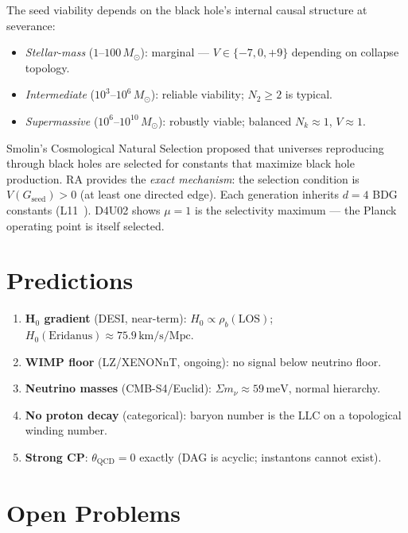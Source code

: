 \documentclass[12pt,a4paper]{article}
\begin{document}
The seed viability depends on the black hole's internal causal structure at severance:
\begin{itemize}
  \item \emph{Stellar-mass} ($1$--$100\,M_\odot$): marginal — $V\in\{-7,0,+9\}$ depending on collapse topology.
  \item \emph{Intermediate} ($10^3$--$10^6\,M_\odot$): reliable viability; $N_2 \geq 2$ is typical.
  \item \emph{Supermassive} ($10^6$--$10^{10}\,M_\odot$): robustly viable; balanced $N_k\approx 1$, $V\approx 1$.
\end{itemize}

Smolin's Cosmological Natural Selection \cite{Smolin1992} proposed that universes reproducing through black holes are selected for constants that maximize black hole production.  RA provides the \emph{exact mechanism}: the selection condition is $V(G_{\mathrm{seed}})>0$ (at least one directed edge).  Each generation inherits $d=4$ BDG constants (L11~\statusLV).  D4U02 shows $\mu=1$ is the selectivity maximum — the Planck operating point is itself selected.

\section{Predictions}

\begin{enumerate}
  \item \textbf{H$_0$ gradient} (DESI, near-term): $H_0 \propto \rho_b(\text{LOS})$; $H_0(\text{Eridanus})\approx75.9\,\mathrm{km/s/Mpc}$.
  \item \textbf{WIMP floor} (LZ/XENONnT, ongoing): no signal below neutrino floor.
  \item \textbf{Neutrino masses} (CMB-S4/Euclid): $\Sigma m_\nu \approx 59\,\mathrm{meV}$, normal hierarchy.
  \item \textbf{No proton decay} (categorical): baryon number is the LLC on a topological winding number.
  \item \textbf{Strong CP}: $\theta_{\mathrm{QCD}} = 0$ exactly (DAG is acyclic; instantons cannot exist).
\end{enumerate}

\section{Open Problems}\label{sec:open}
\end{document}

